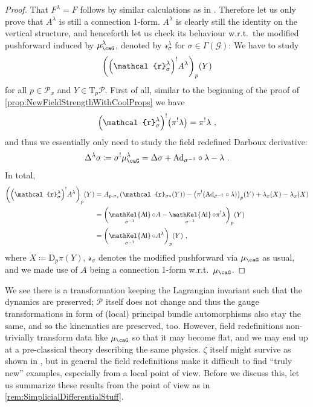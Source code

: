 \documentclass[reqno,a4paper,oneside]{amsart}
\newcommand\mutot{\mu_\caG}
\theoremstyle{plain}
\theoremstyle{remark}
\theoremstyle{definition}
\DeclareMathOperator{\sAd}{\mathKel{A\mkern-5.5mu d}}
\begin{document}
\begin{proof}
\leavevmode\newline
That $F^\lambda = F$ follows by similar calculations as in \cite{My1stpaper, MyThesis}. Therefore let us only prove that $A^\lambda$ is still a connection 1-form. $A^\lambda$ is clearly still the identity on the vertical structure, and henceforth let us check its behaviour w.r.t.\ the modified pushforward induced by $\mutot^{\lambda}$, denoted by $\mathcal{r}_\sigma^\lambda$ for $\sigma \in \Gamma(\mathcal{G})$: We have to study
\begin{equation*}
\mleft(\mleft(\mathcal{r}_\sigma^\lambda\mright)^!A^\lambda\mright)_p(Y)
\end{equation*}
for all $p \in \mathcal{P}_x$ and $Y \in \mathrm{T}_p\mathcal{P}$. First of all, similar to the beginning of the proof of \ref{prop:NewFieldStrengthWithCoolProps} we have
\begin{equation*}
\mleft(\mathcal{r}_\sigma^\lambda\mright)^! \mleft(\pi^! \lambda\mright)
=
\pi^! \lambda ~ ,
\end{equation*}
and thus we essentially only need to study the field redefined Darboux derivative:
\begin{equation*}
\Delta^\lambda \sigma
\coloneqq
\sigma^! \mutot^{\lambda}
=
\Delta \sigma 
	+ \mathrm{Ad}_{\sigma^{-1}} \circ \lambda
	- \lambda ~ .
\end{equation*}
In total,
\begin{align*}
\mleft(\mleft(\mathcal{r}_\sigma^\lambda\mright)^!A^\lambda\mright)_p(Y)
&=
A_{p \cdot \sigma_x}
	\mleft( 
		\mathcal{r}_{\sigma*}(Y)
	\mright)
	- \mleft(\pi^!\mleft( \mathrm{Ad}_{\sigma^{-1}} \circ \lambda \mright)\mright)_p(Y)
	+ \lambda_x(X)
	- \lambda_x(X)
\\
&=
\mleft( \sAd_{\sigma^{-1}} \circ A - \sAd_{\sigma^{-1}} \circ \pi^!\lambda \mright)_p(Y)
\\
&=
\mleft(\sAd_{\sigma^{-1}} \circ A^\lambda\mright)_p(Y) ~ ,
\end{align*}
where $X \coloneqq \mathrm{D}_p\pi(Y)$, $\mathcal{r}_\sigma$ denotes the modified pushforward via $\mutot$ as usual, and we made use of $A$ being a connection 1-form w.r.t.\ $\mutot$.
\end{proof}

We see there is a transformation keeping the Lagrangian invariant such that the dynamics are preserved; $\mathcal{P}$ itself does not change and thus the gauge transformations in form of (local) principal bundle automorphisms also stay the same, and so the kinematics are preserved, too. However, field redefinitions non-trivially transform data like $\mutot$ so that it may become flat, and we may end up at a pre-classical theory describing the same physics. $\zeta$ itself might survive as shown in \cite{My1stpaper, MyThesis}, but in general the field redefinitions make it difficult to find ``truly new'' examples, especially from a local point of view. Before we discuss this, let us summarize these results from the point of view as in \ref{rem:SimplicialDifferentialStuff}.
\end{document}

